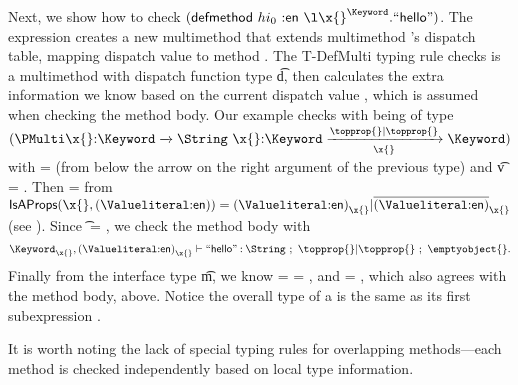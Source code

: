Next, we show how to check
$
{\extendmultiexp {hi_0} {\makekw{en}} {\abs {\x{}} {\Keyword} {\makestr{hello}}}}
$.
%
The expression 
{ {} {}} creates a new multimethod
that extends multimethod 's dispatch table, mapping dispatch value
 to method . The T-DefMulti typing rule
checks  is a multimethod with dispatch function type \t{d},
then calculates the extra information we know based on the current
dispatch value {\thenprop{\proppp{}}}, which is assumed when checking the method
body.
Our example checks with  being of type
$
{\MultiFntype {\ArrowTwo{\x{}}{\Keyword}{\String}}
              {\ArrowOne{\x{}}{\Keyword}{\Keyword}{\filterset{\topprop{}}{\topprop{}}}{\x{}}}}
$
with \objectp{} = {\x{}} (from below the arrow on the right argument of the previous type) and \t{v} = . 
Then {\thenprop{\proppp{}}} = 
{}
from
$
\isacompare{}{\x{}}{\Value{\makekw{en}}}
{\filterset {\isprop {\Value{\makekw{en}}}{\x{}}}{\notprop{\Value{\makekw{en}}}{\x{}}}}
$
(see ).
Since \t{} = \Keyword{}, we check the method body with
$$
\judgement{{\isprop{\Keyword}{\x{}}},{\isprop {\Value{\makekw{en}}}{\x{}}}}
  {\makestr{hello}}
  {\String}{\filterset{\topprop{}}{\topprop{}}}{\emptyobject{}}\text{.}
$$
Finally from the interface type \t{m}, we know \thenprop{\prop{}} = \elseprop{\prop{}} = \topprop{},
and \object{} = \emptyobject{}, which also agrees with the method body, above.
Notice the overall type of a  is the same as its first subexpression .

It is worth noting the lack of special typing rules for overlapping methods---each
method is checked independently based on local type information.

